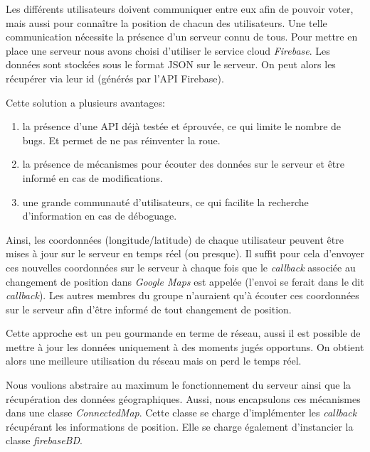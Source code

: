 Les différents utilisateurs doivent communiquer entre eux afin de pouvoir voter, mais aussi pour connaître la position de chacun
des utilisateurs. Une telle communication nécessite la présence d'un serveur connu de tous. Pour mettre en place une serveur nous
avons choisi d'utiliser le service cloud \textit{Firebase}. Les données sont stockées sous le format JSON sur le serveur. On peut
alors les récupérer via leur id (générés par l'API Firebase).
\newline

Cette solution a plusieurs avantages:
\begin{enumerate}
    \item la présence d'une API déjà testée et éprouvée, ce qui limite le nombre de bugs. Et permet de ne pas réinventer la roue.
    \item la présence de mécanismes pour écouter des données sur le serveur et être informé en cas de modifications.
    \item une grande communauté d'utilisateurs, ce qui facilite la recherche d'information en cas de déboguage.
\end{enumerate}

Ainsi, les coordonnées (longitude/latitude) de chaque utilisateur peuvent être mises à jour sur le serveur en temps réel (ou
presque). Il suffit pour cela d'envoyer ces nouvelles coordonnées sur le serveur à chaque fois que le \textit{callback} associée
au changement de position dans \textit{Google Maps} est appelée (l'envoi se ferait dans le dit \textit{callback}). Les autres membres
du groupe n'auraient qu'à écouter ces coordonnées sur le serveur afin d'être informé de tout changement de position.
\newline

Cette approche est un peu gourmande en terme de réseau, aussi il est possible de mettre à jour les données uniquement à des moments jugés
opportuns. On obtient alors une meilleure utilisation du réseau mais on perd le temps réel.
\newline

Nous voulions abstraire au maximum le fonctionnement du serveur ainsi que la récupération des données géographiques. Aussi, nous
encapsulons ces mécanismes dans une classe \textit{ConnectedMap}. Cette classe se charge d'implémenter les \textit{callback}
récupérant les informations de position. Elle se charge également d'instancier la classe \textit{firebaseBD}.
\newline

